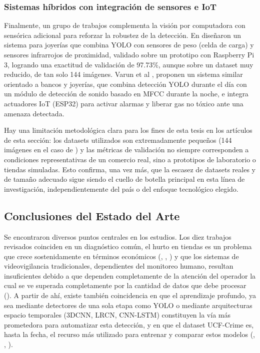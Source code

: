  \subsubsection{Sistemas híbridos con integración de sensores e IoT}
  
    Finalmente, un grupo de trabajos complementa la visión por computadora con sensórica adicional para reforzar la robustez de la detección.
    En \cite{m_deep_2023} diseñaron un sistema para joyerías que combina YOLO con sensores de peso (celda de carga) y sensores infrarrojos de
    proximidad, validado sobre un prototipo con Raspberry Pi 3, logrando una exactitud de validación de 97.73\%, aunque sobre un dataset muy reducido, de
    tan solo 144 imágenes. Varun et al \cite{m_intelligent_2025}, proponen un sistema similar orientado a bancos y joyerías, que combina detección YOLO
    durante el día con un módulo de detección de sonido basado en MFCC durante la noche, e integra actuadores IoT (ESP32) para activar alarmas
    y liberar gas no tóxico ante una amenaza detectada.
    
    Hay una limitación metodológica clara para
    los fines de esta tesis en los artículos de esta sección: los datasets utilizados son extremadamente pequeños (144 imágenes en el caso de \cite{m_deep_2023}) y las métricas
    de validación no siempre corresponden a condiciones representativas de un comercio real, sino a prototipos de laboratorio o tiendas
    simuladas. Esto confirma, una vez más, que la escasez de datasets reales y de tamaño adecuado sigue siendo el cuello de botella principal
    en esta línea de investigación, independientemente del país o del enfoque tecnológico elegido.


  \subsection{Conclusiones del Estado del Arte}
  
  Se encontraron diversos puntos centrales en los estudios. Los diez trabajos revisados coinciden en un
  diagnóstico común, el hurto en tiendas es un problema que crece sostenidamente en términos económicos (\cite{rashvand_exploring_2025}, \cite{v_deep_2024}, \cite{ansari_optimized_2023}) y que los sistemas de videovigilancia tradicionales, dependientes del monitoreo humano, resultan insuficientes debido a que dependen completamente de la atención del operador la cual se ve superada completamente por la cantidad de datos que debe procesar (\cite{anikwe-onyiwa_recent_2025}). A partir de ahí, existe también coincidencia en que el aprendizaje profundo, ya sea mediante detectores de una sola etapa como YOLO o mediante arquitecturas espacio temporales (3DCNN, LRCN, CNN-LSTM) constituyen la vía más prometedora para automatizar esta detección, y en que el dataset UCF-Crime es, hasta la fecha, el recurso más utilizado para entrenar y comparar estos modelos (\cite{martinez-mascorro_suspicious_2021}, \cite{chinthulla_deep_2025}, \cite{hameed_real_2025}).
  
